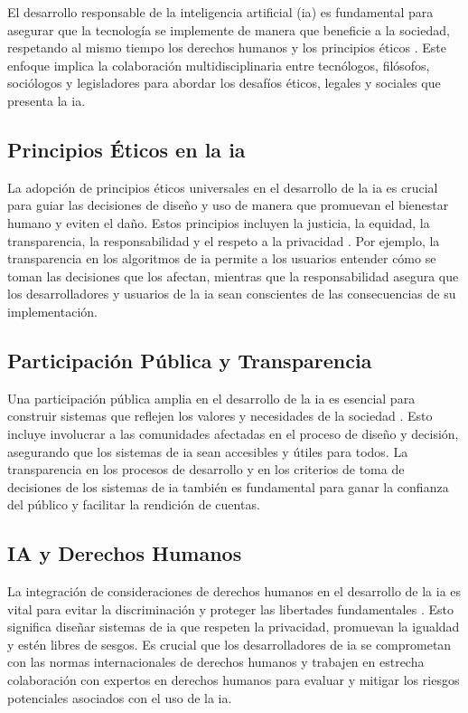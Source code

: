 El desarrollo responsable de la inteligencia artificial (\acrshort{ia}) es fundamental para asegurar que la tecnología se implemente de manera que beneficie a la sociedad, respetando al mismo tiempo los derechos humanos y los principios éticos \cite{Thompson2022}. Este enfoque implica la colaboración multidisciplinaria entre tecnólogos, filósofos, sociólogos y legisladores para abordar los desafíos éticos, legales y sociales que presenta la \acrshort{ia}.

\subsection{Principios Éticos en la \acrshort{ia}}

La adopción de principios éticos universales en el desarrollo de la \acrshort{ia} es crucial para guiar las decisiones de diseño y uso de manera que promuevan el bienestar humano y eviten el daño. Estos principios incluyen la justicia, la equidad, la transparencia, la responsabilidad y el respeto a la privacidad \cite{Williams2022}. Por ejemplo, la transparencia en los \glspl{algoritmo} de \acrshort{ia} permite a los usuarios entender cómo se toman las decisiones que los afectan, mientras que la responsabilidad asegura que los desarrolladores y usuarios de la \acrshort{ia} sean conscientes de las consecuencias de su implementación.

\subsection{Participación Pública y Transparencia}

Una participación pública amplia en el desarrollo de la \acrshort{ia} es esencial para construir sistemas que reflejen los valores y necesidades de la sociedad \cite{Martinez2023}. Esto incluye involucrar a las comunidades afectadas en el proceso de diseño y decisión, asegurando que los sistemas de \acrshort{ia} sean accesibles y útiles para todos. La transparencia en los procesos de desarrollo y en los criterios de toma de decisiones de los sistemas de \acrshort{ia} también es fundamental para ganar la confianza del público y facilitar la rendición de cuentas.

\subsection{IA y Derechos Humanos}

La integración de consideraciones de derechos humanos en el desarrollo de la \acrshort{ia} es vital para evitar la discriminación y proteger las libertades fundamentales \cite{Robinson2023}. Esto significa diseñar sistemas de \acrshort{ia} que respeten la privacidad, promuevan la igualdad y estén libres de sesgos. Es crucial que los desarrolladores de \acrshort{ia} se comprometan con las normas internacionales de derechos humanos y trabajen en estrecha colaboración con expertos en derechos humanos para evaluar y mitigar los riesgos potenciales asociados con el uso de la \acrshort{ia}.

